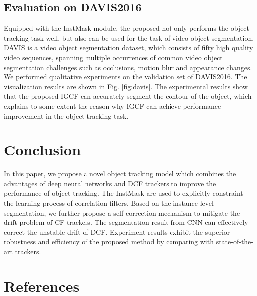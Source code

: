 \documentclass[review]{elsarticle}
\begin{document}
\subsection{Evaluation on DAVIS2016}
Equipped with the InstMask module, the proposed not only performs the object tracking task well, but also can be used for the task of video object segmentation. DAVIS \cite{Perazzi2016} is a video object segmentation dataset, which consists of fifty high quality video sequences, spanning multiple occurrences of common video  object segmentation challenges such as occlusions, motion blur and appearance changes. We performed qualitative experiments on the validation set of DAVIS2016. The visualization results are shown in Fig. \ref{fig:davis}. The experimental results show that the proposed IGCF can accurately segment the contour of the object, which explains to some extent the reason why IGCF can achieve performance improvement in the object tracking task.

\section{Conclusion}
In this paper, we propose a novel object tracking model which combines the advantages of deep neural networks and DCF trackers to improve the performance of object tracking.
The InstMask are used to explicitly constraint the learning process of correlation filters. Based on the instance-level segmentation, we further propose a self-correction mechanism to mitigate the drift problem of CF trackers.
The segmentation result from CNN can effectively correct the unstable drift of DCF.
Experiment results exhibit the superior robustness and efficiency of the proposed method by comparing with state-of-the-art trackers.

\section*{References}


\end{document}
